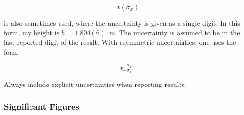 \documentclass[12pt]{article}
\begin{document}
\begin{equation}
x(\sigma_x)
\end{equation}

\noindent
is also sometimes used, where the uncertainty is given as a single
digit. In this form, my height is $h = 1.804(6)$~m. The uncertainty is
assumed to be in the last reported digit of the result. With
asymmetric uncertainties, one uses the form 

\begin{equation}
x^{+\sigma_{x+}}_{-\sigma_{x-}}
\end{equation}

Always include explicit uncertainties when reporting results.

\subsubsection*{Significant Figures}
\end{document}
